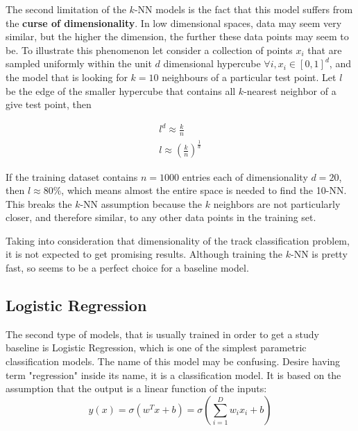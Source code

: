 The second limitation of the $k$-NN models is the fact that this model suffers from the\textbf{ curse of dimensionality}.  In low dimensional spaces, data may seem very similar, but the higher the dimension, the further these data points may seem to be. To illustrate this phenomenon let consider a collection of points $x_i$ that are sampled uniformly within the unit  $d$ dimensional hypercube $\forall i, x_i \in [0,1]^{d} $, and the model that is looking for $k=10$ neighbours of a particular test point. Let $l$ be the edge of the smaller hypercube that contains all $k$-nearest neighbor of a give test point, then 

\begin{align}
l^{d} \approx \frac{k}{n} \nonumber \\
l \approx (\frac{k}{n})^{\frac{1}{d}}
\end{align}

If the training dataset contains $n=1000$ entries each of dimensionality $d=20$, then $l \approx 80\%$, which means almost the entire space is needed to find the 10-NN. This breaks the $k$-NN  assumption because the $k$ neighbors are not particularly closer, and therefore similar, to any other data points in the training set. 

Taking into consideration that dimensionality of the track classification problem, it is not expected to get promising results. Although training the $k$-NN is pretty fast, so seems to be a perfect choice for a baseline model. 

\subsection{Logistic Regression}
\label{sec:LogReg}
The second type of models, that is usually trained in order to get a study baseline is Logistic Regression, which is one of the simplest parametric classification models. The name of this model may be confusing. Desire having term "regression" inside its name, it is a classification model. It is based on the assumption that the output is a linear function of the inputs: 
\begin{equation}
\label{eq:logreg}
    y(x) = \sigma (w^{T}x + b) = \sigma \left(\sum_{i=1}^{D}w_ix_i +b\right) 
\end{equation}


